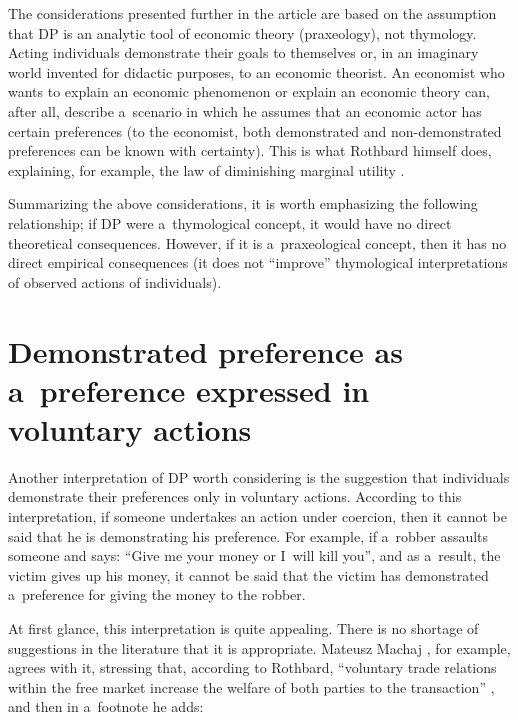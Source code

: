The considerations presented further in the article are based on the assumption that DP is an analytic tool of economic theory (praxeology), not thymology. Acting individuals demonstrate their goals to themselves or, in an imaginary world invented for didactic purposes, to an economic theorist. An economist who wants to explain an economic phenomenon or explain an economic theory can, after all, describe a~scenario in which he assumes that an economic actor has certain preferences (to the economist, both demonstrated and non-demonstrated preferences can be known with certainty). This is what Rothbard himself does, explaining, for example, the law of diminishing marginal utility 
\parencite[][pp.21–33]{rothbard_man_2009}.%




Summarizing the above considerations, it is worth emphasizing the following relationship; if DP were a~thymological concept, it would have no direct theoretical consequences. However, if it is a~praxeological concept, then it has no direct empirical consequences (it does not ``improve'' thymological interpretations of observed actions of individuals).



\section{Demonstrated preference as a~preference expressed in voluntary actions}

Another interpretation of DP worth considering is the suggestion that individuals demonstrate their preferences only in voluntary actions. According to this interpretation, if someone undertakes an action under coercion, then it cannot be said that he is demonstrating his preference. For example, if a~robber assaults someone and says: ``Give me your money or I~will kill you'', and as a~result, the victim gives up his money, it cannot be said that the victim has demonstrated a~preference for giving the money to the robber.



At first glance, this interpretation is quite appealing. There is no shortage of suggestions in the literature that it is appropriate. Mateusz Machaj 
\parencite*[][]{machaj_murray_2014}, %
 for example, agrees with it, stressing that, according to Rothbard, ``voluntary trade relations within the free market increase the welfare of both parties to the transaction'' 
\parencite[][own transl.]{machaj_murray_2014}, %
 and then in a~footnote he adds:



